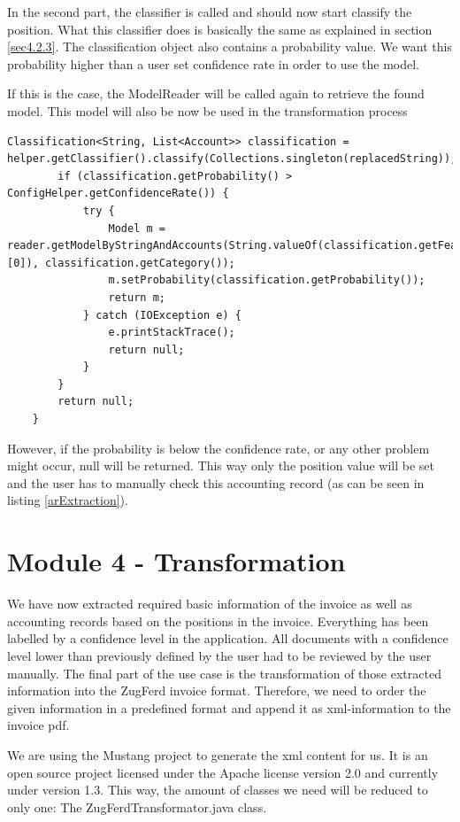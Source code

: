 In the second part, the classifier is called and should now start classify the position. What this classifier does is basically the same as explained in section \ref{sec4.2.3}. The classification object also contains a probability value. We want this probability higher than a user set confidence rate in order to use the model.

If  this is the case, the ModelReader will be called again to retrieve the found model. This model will also be now be used in the transformation process 

\begin{lstlisting}[caption={Classification of a position}]
        Classification<String, List<Account>> classification = helper.getClassifier().classify(Collections.singleton(replacedString));
        if (classification.getProbability() > ConfigHelper.getConfidenceRate()) {
            try {
                Model m = reader.getModelByStringAndAccounts(String.valueOf(classification.getFeatureset().toArray()[0]), classification.getCategory());
                m.setProbability(classification.getProbability());
                return m;
            } catch (IOException e) {
                e.printStackTrace();
                return null;
            }
        }
        return null;
    }
\end{lstlisting}

However, if the probability is below the confidence rate, or any other problem might occur, null will be returned. This way only the position value will be set and the user has to manually check this accounting record (as can be seen in listing \ref{arExtraction}).
    
\section{Module 4 - Transformation}

We have now extracted required basic information of the invoice as well as accounting records based on the positions in the invoice. Everything has been labelled by a confidence level in the application. All documents with a confidence level lower than previously defined by the user had to be reviewed by the user manually.
The final part of the use case is the transformation of those extracted information into the ZugFerd invoice format. Therefore, we need to order the given information in a predefined format and append it as xml-information to the invoice pdf.

We are using the Mustang project to generate the xml content for us. It is an open source project licensed under the Apache license version 2.0 and currently under version 1.3. This way, the amount of classes we need will be reduced to only one: The ZugFerdTransformator.java class.

